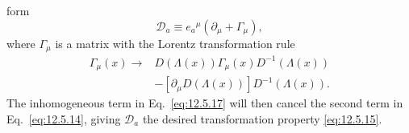 form
\begin{equation}
  \mathcal D_a
  \equiv
  e_a{}^\mu\left(\partial_\mu+\Gamma_\mu\right),
  \tag{12.5.16}\label{eq:12.5.16}
\end{equation}
where \(\Gamma_\mu\) is a matrix with the Lorentz transformation rule
\begin{equation}
\begin{aligned}
  \Gamma_\mu(x)\longrightarrow{}&
  D(\Lambda(x))\Gamma_\mu(x)D^{-1}(\Lambda(x))
  \\
  &-[\partial_\mu D(\Lambda(x))]D^{-1}(\Lambda(x)).
\end{aligned}
  \tag{12.5.17}\label{eq:12.5.17}
\end{equation}
The inhomogeneous term in Eq.~\eqref{eq:12.5.17} will then cancel the second
term in Eq.~\eqref{eq:12.5.14}, giving \(\mathcal D_a\) the desired
transformation property \eqref{eq:12.5.15}.

